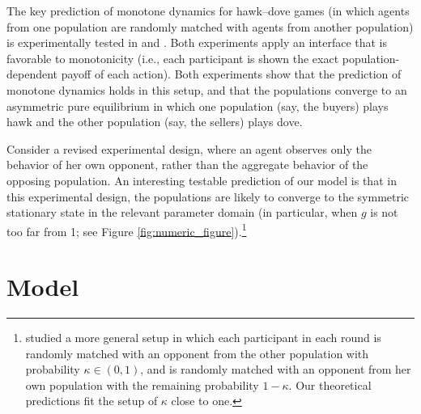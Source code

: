\documentclass[12pt]{article}
\numberwithin{equation}{section}
\numberwithin{figure}{section}
\theoremstyle{definition}
\theoremstyle{plain}
\theoremstyle{plain}
\theoremstyle{plain}
\theoremstyle{remark}
\theoremstyle{plain}
\theoremstyle{plain}
\begin{document}
The key prediction of monotone dynamics for hawk–dove games (in which agents from one population are randomly matched with agents from another population) is experimentally tested in \cite{oprea2011separating} and \cite{benndorf2016equilibrium}. Both experiments apply an interface that is favorable to monotonicity (i.e., each participant is shown the exact population-dependent payoff of each action). Both experiments show that the prediction of monotone dynamics holds in this setup, and that the populations converge to an asymmetric pure equilibrium in which one population (say, the buyers) plays hawk and the other population (say, the sellers) plays dove. 

Consider a revised experimental design, where an agent observes only the behavior of her own opponent, rather than the aggregate behavior of the opposing population. An interesting testable prediction of our model is that in this experimental design, the populations are likely to converge to the symmetric stationary state in the relevant parameter domain 
(in particular, when $g$ is not too far from 1; see Figure
\ref{fig:numeric_figure}).\footnote{\cite{benndorf2016equilibrium, benndorf2021games} 
studied a more general setup in which each participant in each round is randomly matched with an opponent from the other population with probability $\kappa \in (0,1)$, and is randomly matched with an opponent from her own population with the remaining probability $1-\kappa$. Our theoretical  predictions fit the setup of $\kappa$ close to one.}


\section{Model}\label{sec:model}
\end{document}
